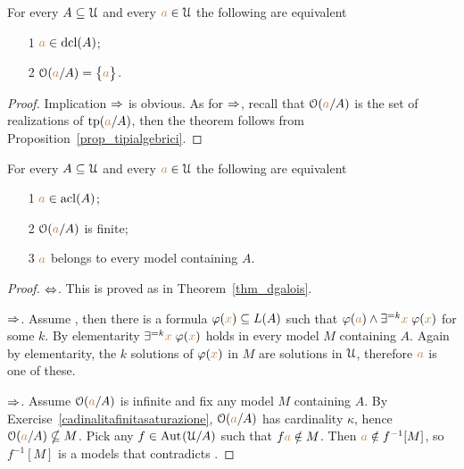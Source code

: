 \begin{theorem}\label{thm_dgalois}
For every $A\subseteq\EuScript U$ and every ${\color{brown} a}\in\EuScript U$ the following are equivalent
\begin{itemize}
\item[1] ${\color{brown} a}\in\mathop{\rm dcl}(A)$;
\item[2] $\EuScript O({\color{brown} a}/A)=\big\{{\color{brown} a}\big\}$.
\end{itemize}
\end{theorem}

\begin{proof} 
Implication $\Rightarrow$ is obvious. As for  $\Rightarrow$, recall that $\EuScript O({\color{brown} a}/A)$ is the set of realizations of ${\rm tp}({\color{brown} a}/A)$, then the theorem follows from Proposition~\ref{prop_tipialgebrici}.
\end{proof}


\begin{theorem}\label{thm_fmgalois}
For every $A\subseteq\EuScript U$ and every ${\color{brown} a}\in\EuScript U$ the following are equivalent
\begin{itemize}
\item[1] ${\color{brown} a}\in\mathop{\rm acl}(A)$;
\item[2] $\EuScript O({\color{brown} a}/A)$ is finite;
\item[3] ${\color{brown} a}$ belongs to every model containing $A$.
\end{itemize}
\end{theorem}

\begin{proof} $\Leftrightarrow$. This is proved as in Theorem~\ref{thm_dgalois}. 

$\Rightarrow$. Assume , then there is a formula $\varphi({\color{brown} x})\subseteq L(A)$ such that $\varphi({\color{brown} a})\wedge\exists^{=k}{\color{brown} x}\;\varphi({\color{brown} x})$ for some $k$. By elementarity $\exists^{=k}{\color{brown} x}\;\varphi({\color{brown} x})$ holds in every model $M$ containing $A$. Again by elementarity, the $k$ solutions of $\varphi({\color{brown} x})$ in $M$ are solutions in $\EuScript U$, therefore ${\color{brown} a}$ is one of these.

$\Rightarrow$. Assume $\EuScript O({\color{brown} a}/A)$ is infinite and fix any model $M$ containing $A$. By Exercise~\ref{cadinalitafinitasaturazione}, $\EuScript O({\color{brown} a}/A)$  has cardinality $\kappa$, hence $\EuScript O({\color{brown} a}/A)\nsubseteq M$. Pick any $f\in\textrm{Aut\kern.15ex}(\EuScript U/A)$ such that $f{\color{brown} a}\notin M$. Then ${\color{brown} a}\notin f^{-1}[M]$, so $f^{-1}[M]$ is a models that contradicts .
\end{proof}




